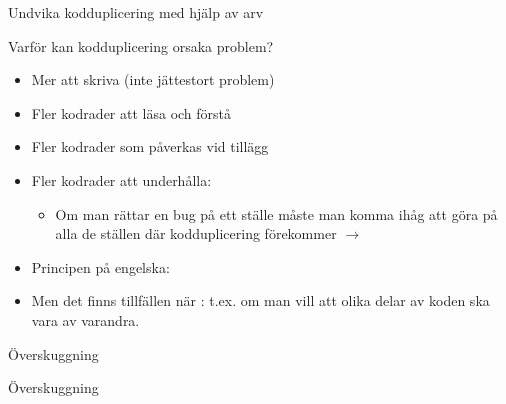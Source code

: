 \begin{Slide}{Undvika kodduplicering med hjälp av arv}
\ifkompendium
{}
\else
\fi
\end{Slide}




\begin{Slide}{Varför kan kodduplicering orsaka problem?}
\begin{itemize}
\item Mer att skriva (inte jättestort problem)
\pause
\item Fler kodrader att läsa och förstå
\pause
\item Fler kodrader som påverkas vid tillägg
\pause

\item Fler kodrader att underhålla:
\begin{itemize}
\item Om man rättar en bug på ett ställe måste man komma ihåg att göra  på alla de ställen där kodduplicering förekommer $\rightarrow$ 
\end{itemize}

\pause

\item Principen på engelska: 

\pause

\item {Men det finns tillfällen när  : \pause t.ex. om man vill att olika delar av koden ska vara  av varandra.}
\end{itemize}
\end{Slide}



\ifkompendium
\begin{Slide}{Överskuggning}
  \vspace{-0.5em}
\end{Slide}
\else
\begin{Slide}{Överskuggning}
  \vspace{-0.5em}
\end{Slide}
\fi


